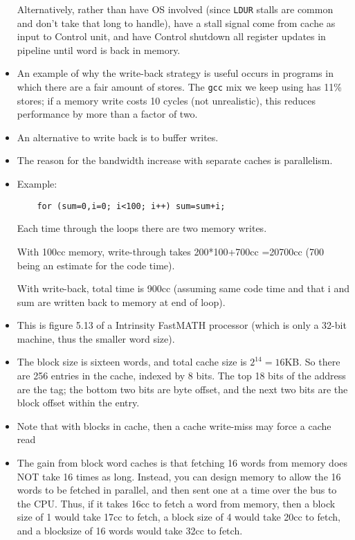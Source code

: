 \begin{frame}[fragile]
\begin{itemize}
	Alternatively, rather than have OS involved (since \texttt{LDUR} stalls
	are common and don't take that long to handle), have a stall signal
	come from cache as input to Control unit, and have Control shutdown
	all register updates in pipeline until word is back in memory.
\item An example of why the write-back strategy is useful occurs in programs
	in which there are a fair amount of stores. The {\tt gcc} mix we keep
	using has 11\% stores; if a memory write costs 10 cycles (not
	unrealistic), this reduces performance by more than a factor of
	two. 
\item An alternative to write back is to buffer writes. 
\item The reason for
	the bandwidth increase with separate caches is parallelism.
\item Example:
\begin{verbatim}
    for (sum=0,i=0; i<100; i++) sum=sum+i;
\end{verbatim}
Each time through the loops there are two memory writes.

With 100cc memory, write-through takes 200*100+700cc =20700cc (700 being an estimate for the code time).

With write-back, total time is 900cc (assuming same code time and that i and sum are written back to memory at end of loop).
\end{itemize}
\fi\ENotes
\end{frame}

\newpage
\begin{frame}[fragile]
\BNotes\ifnum{}
\begin{itemize}
\item
  This is figure 5.13 of a Intrinsity FastMATH processor (which is only a
  32-bit machine, thus the smaller word size).
  
\item The block size is sixteen words, and
  total cache size is $2^{14}=16$KB. So there are 256 entries
  in the cache, indexed by 8 bits. The top 18 bits of the address are
  the tag; the bottom two bits are byte offset, and the next two bits
  are the block offset within the entry.
\item Note that with blocks in cache, then a cache write-miss may force a
	cache read
\item The gain from block word caches is that fetching 16 words from memory
	does NOT take 16 times as long.  Instead, you can design memory to
	allow the 16 words to be fetched in parallel, and then sent one at
	a time over the bus to the CPU.  Thus, if it takes 16cc to fetch a
	word from memory, then a block size of 1 would take 17cc to fetch,
	a block size of 4 would take 20cc to fetch, and a blocksize of 16
        words would take 32cc to fetch.
\end{itemize}
\fi\ENotes
\end{frame}

